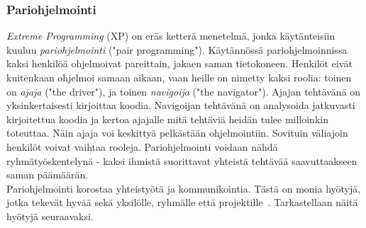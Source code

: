 \documentclass[finnish]{../tktltiki2}
\theoremstyle{definition}
\theoremstyle{remark}
\begin{document}
\subsubsection{Pariohjelmointi}

\emph{Extreme Programming} (XP) on eräs ketterä menetelmä, jonka käytänteisiin kuuluu \emph{pariohjelmointi} ("pair programming"). Käytännössä pariohjelmoinnissa kaksi henkilöä ohjelmoivat pareittain, jakaen saman tietokoneen. Henkilöt eivät kuitenkaan ohjelmoi samaan aikaan, vaan heille on nimetty kaksi roolia: toinen on \emph{ajaja} ("the driver"), ja toinen \emph{navigoija} ("the navigator"). Ajajan tehtävänä on yksinkertaisesti kirjoittaa koodia. Navigoijan tehtävänä on analysoida jatkuvasti kirjoitettua koodia ja kertoa ajajalle mitä tehtäviä heidän tulee milloinkin toteuttaa. Näin ajaja voi keskittyä pelkästään ohjelmointiin. Sovituin väliajoin henkilöt voivat vaihtaa rooleja. Pariohjelmointi voidaan nähdä ryhmätyöskentelynä - kaksi ihmistä suorittavat yhteistä tehtävää saavuttaakseen saman päämäärän.~\cite{Shore:2007:AAD:1407480} \\

Pariohjelmointi korostaa yhteistyötä ja kommunikointia. Tästä on monia hyötyjä, jotka tekevät hyvää sekä yksilölle, ryhmälle että projektille~\cite{Begel:2008:PPW:1414004.1414026}. Tarkastellaan näitä hyötyjä seuraavaksi. 
\end{document}
